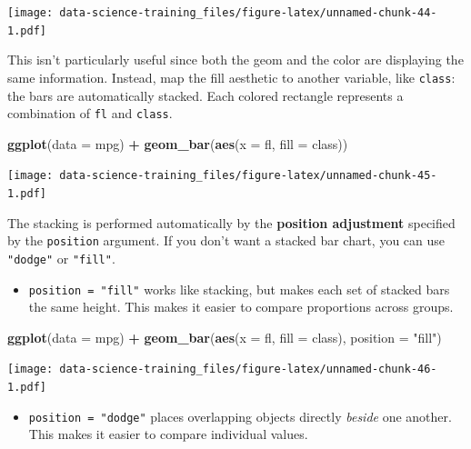 \documentclass[]{book}
\newenvironment{Shaded}{\begin{snugshade}}{\end{snugshade}}
\newcommand{\KeywordTok}[1]{\textcolor[rgb]{0.13,0.29,0.53}{\textbf{#1}}}
\newcommand{\DataTypeTok}[1]{\textcolor[rgb]{0.13,0.29,0.53}{#1}}
\newcommand{\StringTok}[1]{\textcolor[rgb]{0.31,0.60,0.02}{#1}}
\newcommand{\OperatorTok}[1]{\textcolor[rgb]{0.81,0.36,0.00}{\textbf{#1}}}
\newcommand{\NormalTok}[1]{#1}
\providecommand{\tightlist}{%
  \setlength{\itemsep}{0pt}\setlength{\parskip}{0pt}}
\theoremstyle{definition}
\theoremstyle{definition}
\theoremstyle{definition}
\theoremstyle{remark}
\begin{document}
\texttt{[image: data-science-training\_files/figure-latex/unnamed-chunk-44-1.pdf]}

This isn't particularly useful since both the geom and the color are
displaying the same information. Instead, map the fill aesthetic to
another variable, like \texttt{class}: the bars are automatically
stacked. Each colored rectangle represents a combination of \texttt{fl}
and \texttt{class}.

\begin{Shaded}
\begin{Highlighting}[]
\KeywordTok{ggplot}\NormalTok{(}\DataTypeTok{data =}\NormalTok{ mpg) }\OperatorTok{+}\StringTok{ }
\StringTok{  }\KeywordTok{geom_bar}\NormalTok{(}\KeywordTok{aes}\NormalTok{(}\DataTypeTok{x =}\NormalTok{ fl, }\DataTypeTok{fill =}\NormalTok{ class))}
\end{Highlighting}
\end{Shaded}

\texttt{[image: data-science-training\_files/figure-latex/unnamed-chunk-45-1.pdf]}

The stacking is performed automatically by the \textbf{position
adjustment} specified by the \texttt{position} argument. If you don't
want a stacked bar chart, you can use \texttt{"dodge"} or
\texttt{"fill"}.

\begin{itemize}
\tightlist
\item
  \texttt{position\ =\ "fill"} works like stacking, but makes each set
  of stacked bars the same height. This makes it easier to compare
  proportions across groups.
\end{itemize}

\begin{Shaded}
\begin{Highlighting}[]
    \KeywordTok{ggplot}\NormalTok{(}\DataTypeTok{data =}\NormalTok{ mpg) }\OperatorTok{+}\StringTok{ }
\StringTok{      }\KeywordTok{geom_bar}\NormalTok{(}\KeywordTok{aes}\NormalTok{(}\DataTypeTok{x =}\NormalTok{ fl, }\DataTypeTok{fill =}\NormalTok{ class), }\DataTypeTok{position =} \StringTok{"fill"}\NormalTok{)}
\end{Highlighting}
\end{Shaded}

\texttt{[image: data-science-training\_files/figure-latex/unnamed-chunk-46-1.pdf]}

\begin{itemize}
\tightlist
\item
  \texttt{position\ =\ "dodge"} places overlapping objects directly
  \emph{beside} one another. This makes it easier to compare individual
  values.
\end{itemize}
\end{document}

